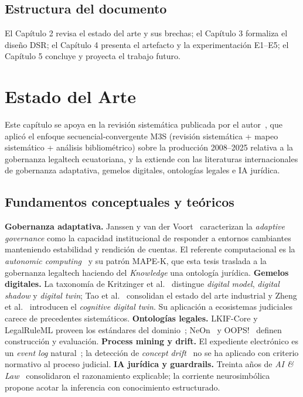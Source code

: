 \documentclass[a4paper,openany,12pt]{book}
\begin{document}
\section{Estructura del documento}
El Capítulo 2 revisa el estado del arte y sus brechas; el Capítulo 3 formaliza el diseño DSR; el Capítulo 4 presenta el artefacto y la experimentación E1--E5; el Capítulo 5 concluye y proyecta el trabajo futuro.

\chapter{Estado del Arte}
Este capítulo se apoya en la revisión sistemática publicada por el autor~\cite{paccha2025slr}, que aplicó el enfoque secuencial-convergente M3S (revisión sistemática + mapeo sistemático + análisis bibliométrico) sobre la producción 2008--2025 relativa a la gobernanza legaltech ecuatoriana, y la extiende con las literaturas internacionales de gobernanza adaptativa, gemelos digitales, ontologías legales e IA jurídica.
\section{Fundamentos conceptuales y teóricos}
\textbf{Gobernanza adaptativa.} Janssen y van der Voort~\cite{janssen2016} caracterizan la \textit{adaptive governance} como la capacidad institucional de responder a entornos cambiantes manteniendo estabilidad y rendición de cuentas. El referente computacional es la \textit{autonomic computing}~\cite{kephart2003} y su patrón MAPE-K, que esta tesis traslada a la gobernanza legaltech haciendo del \textit{Knowledge} una ontología jurídica.
\textbf{Gemelos digitales.} La taxonomía de Kritzinger et al.~\cite{kritzinger2018} distingue \textit{digital model}, \textit{digital shadow} y \textit{digital twin}; Tao et al.~\cite{tao2019} consolidan el estado del arte industrial y Zheng et al.~\cite{zheng2022} introducen el \textit{cognitive digital twin}. Su aplicación a ecosistemas judiciales carece de precedentes sistemáticos.
\textbf{Ontologías legales.} LKIF-Core y LegalRuleML proveen los estándares del dominio~\cite{casanovas2016}; NeOn~\cite{suarez2015} y OOPS!~\cite{poveda2014} definen construcción y evaluación.
\textbf{Process mining y drift.} El expediente electrónico es un \textit{event log} natural~\cite{aalst2012}; la detección de \textit{concept drift}~\cite{bose2014,gama2014} no se ha aplicado con criterio normativo al proceso judicial.
\textbf{IA jurídica y guardrails.} Treinta años de \textit{AI \& Law}~\cite{bench2012,governatori2022} consolidaron el razonamiento explicable; la corriente neurosimbólica~\cite{garcez2023} propone acotar la inferencia con conocimiento estructurado.
\end{document}
